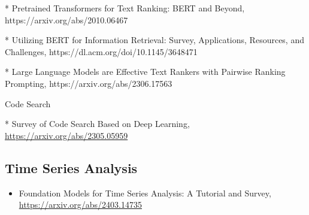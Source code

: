 * Pretrained Transformers for Text Ranking: BERT and Beyond, https://arxiv.org/abs/2010.06467

* Utilizing BERT for Information Retrieval: Survey, Applications, Resources, and Challenges, https://dl.acm.org/doi/10.1145/3648471

* Large Language Models are Effective Text Rankers with Pairwise Ranking Prompting, https://arxiv.org/abs/2306.17563

Code Search

* Survey of Code Search Based on Deep Learning, \url{https://arxiv.org/abs/2305.05959}

\subsection{Time Series Analysis}

\begin{itemize}
\item Foundation Models for Time Series Analysis: A Tutorial and Survey, \url{https://arxiv.org/abs/2403.14735}
\end{itemize}
